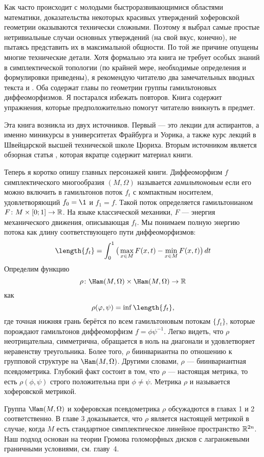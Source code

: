 Как часто происходит с молодыми быстроразвивающимися областями математики, доказательства некоторых красивых утверждений хоферовской геометрии оказываются технически сложными.
Поэтому я выбрал самые простые нетривиальные случаи основных утверждений (на свой вкус, конечно), не пытаясь представить их в максимальной общности.
По той же причине опущены многие технические детали.
Хотя формально эта книга не требует особых знаний в симплектической топологии (по крайней мере, необходимые определения и формулировки приведены), я рекомендую читателю  два замечательных вводных текста \cite{HZ} и \cite{MS}.
Оба содержат главы по геометрии группы гамильтоновых диффеоморфизмов.
Я постарался избежать повторов.
Книга содержит упражнения, которые предположительно помогут читателю вникнуть в предмет.

Эта книга возникла из двух источников.
Первый — это лекции для аспирантов, а именно миникурсы в университетах Фрайбурга и Уорика, а также курс лекций в Швейцарской высшей технической школе Цюриха.
Вторым источником является обзорная статья \cite{P8}, которая вкратце содержит материал книги.

Теперь я коротко опишу главных персонажей книги.
Диффеоморфизм $f$ симплектического многообразия $(M,\Omega)$
называется \emph{гамильтоновым} если его можно включить в гамильтонов поток $f_t$ с компактным носителем, удовлетворяющий $f_0=\1$ и $f_1 =f$.
Такой поток определяется гамильтонианом $F\colon M \times [0;1] \to \mathbb{R}$.
На языке классической механики, $F$ — энергия механического движения, описывающая $f_t$.
Мы понимаем полную энергию потока как длину соответствующего пути диффеоморфизмов:
\[\length \{f_t\} =
\int_0^1\big(\max_{x\in M}F(x,t)-\min_{x\in M}F(x,t)\big)\, dt 
\]%
Определим функцию
\[\rho\: \Ham(M,\Omega) \times \Ham(M,\Omega) \to \RR\]
как
\[\rho (\phi, \psi) = \inf \length \{f_t\},\]
где точная нижняя грань берётся по всем гамильтоновым потокам $\{f_t\}$, которые
порождают гамильтонов диффеоморфизм $f = \phi\psi^{-1}$.
Легко видеть, что $\rho$ неотрицательна, симметрична, обращается в
ноль на диагонали и удовлетворяет неравенству треугольника. 
Более того, $\rho$ биинвариантна по отношению к групповой структуре на $\Ham(M,\Omega)$.
Другими словами, $\rho$ — биинвариантная псевдометрика.
Глубокий факт состоит в том, что $\rho$ — настоящая метрика, то есть
$\rho (\phi, \psi)$ строго положительна при $\phi \ne \psi$. 
Метрика $\rho$ и называется хоферовской метрикой.

Группа $\Ham(M,\Omega)$ и хоферовская псевдометрика $\rho$ обсужадются в главах 1 и 2 соответственно.
В главе 3 доказывается, что $\rho$ является настоящей метрикой в случае, когда $M$ есть стандартное симплектическое линейное пространство $\mathbb{R}^{2n}$.
Наш подход основан на теории Громова голоморфных дисков с лагранжевыми граничными условиями, см.
главу~4.


